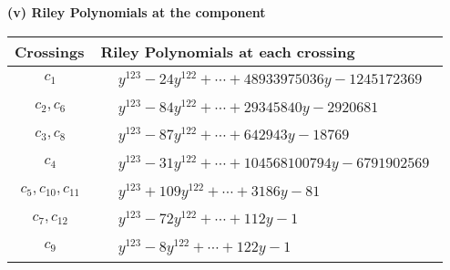 \documentclass[1p]{elsarticle_modified}
\theoremstyle{definition}
\begin{document}
\flushleft \textbf{(v) Riley Polynomials at the component}\newline \\
\begin{tabular}{m{50pt}|m{274pt}}
Crossings & \hspace{64pt}Riley Polynomials at each crossing \\
\hline $$\begin{aligned}c_{1}\end{aligned}$$&$\begin{aligned}
&y^{123}-24 y^{122}+\cdots+48933975036 y-1245172369
\end{aligned}$\\
\hline $$\begin{aligned}c_{2},c_{6}\end{aligned}$$&$\begin{aligned}
&y^{123}-84 y^{122}+\cdots+29345840 y-2920681
\end{aligned}$\\
\hline $$\begin{aligned}c_{3},c_{8}\end{aligned}$$&$\begin{aligned}
&y^{123}-87 y^{122}+\cdots+642943 y-18769
\end{aligned}$\\
\hline $$\begin{aligned}c_{4}\end{aligned}$$&$\begin{aligned}
&y^{123}-31 y^{122}+\cdots+104568100794 y-6791902569
\end{aligned}$\\
\hline $$\begin{aligned}c_{5},c_{10},c_{11}\end{aligned}$$&$\begin{aligned}
&y^{123}+109 y^{122}+\cdots+3186 y-81
\end{aligned}$\\
\hline $$\begin{aligned}c_{7},c_{12}\end{aligned}$$&$\begin{aligned}
&y^{123}-72 y^{122}+\cdots+112 y-1
\end{aligned}$\\
\hline $$\begin{aligned}c_{9}\end{aligned}$$&$\begin{aligned}
&y^{123}-8 y^{122}+\cdots+122 y-1
\end{aligned}$\\
\hline
\end{tabular}\\~\\
\end{document}
